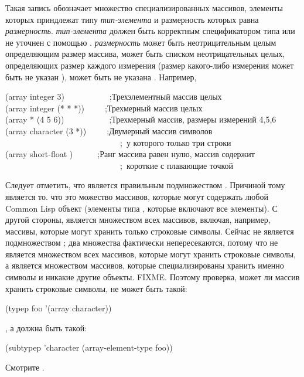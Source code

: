 \begin{flushdesc}
\item[\cd{(array \emph{тип-элемента} \emph{размерность})}]
Такая запись обозначает множество специализированных массивов, элементы которых
приндлежат типу \emph{тип-элемента} и размерность которых равна \emph{размерность}.
\emph{тип-элемента} должен быть корректным спецификатором типа или не уточнен с
помощью \cdf{*}.
\emph{размерность} может быть неотрицительным целым определяющим размер массива,
может быть списком неотрицательных целых, определяющих размер каждого измерения
(размер какого-либо измерения может быть не указан \cdf{*}), может быть не
указана \cdf{*}.
Например,
\begin{lisp}
(array integer 3)~~~~~~~~~~~;\textrm{Трехэлементный массив целых} \\
(array integer (* * *))~~~~~;\textrm{Трехмерный массив целых} \\
(array * (4 5 6))~~~~~~~~~~~;\textrm{Трехмерный массив, размеры измерений
  4,5,6} \\
(array character (3 *))~~~~~;\textrm{Двумерный массив символов} \\
~~~~~~~~~~~~~~~~~~~~~~~~~~~~;~\textrm{у которого только три строки} \\
(array short-float {\emptylist})~~~~~~;\textrm{Ранг массива равен нулю, массив содержит} \\
~~~~~~~~~~~~~~~~~~~~~~~~~~~~;~\textrm{короткие с плавающие точкой}
\end{lisp}
Следует отметить, что  является правильным подмножеством
.
Причиной тому является то. что  это можество массивов, которые
могут содержать любой Common Lisp объект (элементы типа , которые включают
все элементы). С другой стороны,  является множеством всех
массивов, включая, например, массивы, которые могут хранить только строковые
символы. Сейчас  не является подмножеством ;
два множества фактически непересекаются, потому что  не
является множеством всех массивов, которые могут хранить строковые символы, а
является множеством массивов, которые специализированы хранить именно символы и
никакие другие объекты. FIXME. Поэтому проверка, может ли массив  хранить
строковые символы, не может быть такой:
\begin{lisp}
(typep foo '(array character))
\end{lisp}
, а должна быть такой:
\begin{lisp}
(subtypep 'character (array-element-type foo))
\end{lisp}
Смотрите .


\end{flushdesc}
